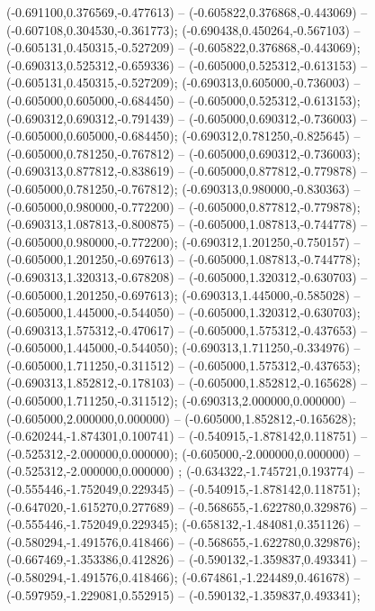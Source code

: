  (-0.691100,0.376569,-0.477613) -- (-0.605822,0.376868,-0.443069) -- (-0.607108,0.304530,-0.361773);
 (-0.690438,0.450264,-0.567103) -- (-0.605131,0.450315,-0.527209) -- (-0.605822,0.376868,-0.443069);
 (-0.690313,0.525312,-0.659336) -- (-0.605000,0.525312,-0.613153) -- (-0.605131,0.450315,-0.527209);
 (-0.690313,0.605000,-0.736003) -- (-0.605000,0.605000,-0.684450) -- (-0.605000,0.525312,-0.613153);
 (-0.690312,0.690312,-0.791439) -- (-0.605000,0.690312,-0.736003) -- (-0.605000,0.605000,-0.684450);
 (-0.690312,0.781250,-0.825645) -- (-0.605000,0.781250,-0.767812) -- (-0.605000,0.690312,-0.736003);
 (-0.690313,0.877812,-0.838619) -- (-0.605000,0.877812,-0.779878) -- (-0.605000,0.781250,-0.767812);
 (-0.690313,0.980000,-0.830363) -- (-0.605000,0.980000,-0.772200) -- (-0.605000,0.877812,-0.779878);
 (-0.690313,1.087813,-0.800875) -- (-0.605000,1.087813,-0.744778) -- (-0.605000,0.980000,-0.772200);
 (-0.690312,1.201250,-0.750157) -- (-0.605000,1.201250,-0.697613) -- (-0.605000,1.087813,-0.744778);
 (-0.690313,1.320313,-0.678208) -- (-0.605000,1.320312,-0.630703) -- (-0.605000,1.201250,-0.697613);
 (-0.690313,1.445000,-0.585028) -- (-0.605000,1.445000,-0.544050) -- (-0.605000,1.320312,-0.630703);
 (-0.690313,1.575312,-0.470617) -- (-0.605000,1.575312,-0.437653) -- (-0.605000,1.445000,-0.544050);
 (-0.690313,1.711250,-0.334976) -- (-0.605000,1.711250,-0.311512) -- (-0.605000,1.575312,-0.437653);
 (-0.690313,1.852812,-0.178103) -- (-0.605000,1.852812,-0.165628) -- (-0.605000,1.711250,-0.311512);
 (-0.690313,2.000000,0.000000) -- (-0.605000,2.000000,0.000000) -- (-0.605000,1.852812,-0.165628);
 (-0.620244,-1.874301,0.100741) -- (-0.540915,-1.878142,0.118751) -- (-0.525312,-2.000000,0.000000);
 (-0.605000,-2.000000,0.000000) -- (-0.525312,-2.000000,0.000000) ;
 (-0.634322,-1.745721,0.193774) -- (-0.555446,-1.752049,0.229345) -- (-0.540915,-1.878142,0.118751);
 (-0.647020,-1.615270,0.277689) -- (-0.568655,-1.622780,0.329876) -- (-0.555446,-1.752049,0.229345);
 (-0.658132,-1.484081,0.351126) -- (-0.580294,-1.491576,0.418466) -- (-0.568655,-1.622780,0.329876);
 (-0.667469,-1.353386,0.412826) -- (-0.590132,-1.359837,0.493341) -- (-0.580294,-1.491576,0.418466);
 (-0.674861,-1.224489,0.461678) -- (-0.597959,-1.229081,0.552915) -- (-0.590132,-1.359837,0.493341);
